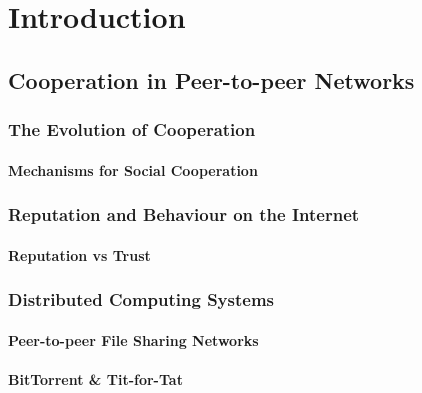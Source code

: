 \chapter{Introduction}
\label{chap:introduction}



\section{Cooperation in Peer-to-peer Networks}
\label{sec:Cooperation in Peer-to-peer Networks}


\subsection{The Evolution of Cooperation}
\label{subsec:The Evolution of Cooperation}

\subsubsection{Mechanisms for Social Cooperation}
\label{subsubsec:Mechanisms for Social Cooperation}


\subsection{Reputation and Behaviour on the Internet}
\label{subsec:Reputation and Behaviour on the Internet}

\subsubsection{Reputation vs Trust}
\label{subsubsec:Reputation vs Trust}


\subsection{Distributed Computing Systems}
\label{subsec:Distributed Computing Systems}

\subsubsection{Peer-to-peer File Sharing Networks}
\label{subsubsec:Peer-to-peer File Sharing Networks}

\subsubsection{BitTorrent \& Tit-for-Tat}
\label{subsubsec:BitTorrent & Tit-for-Tat}

